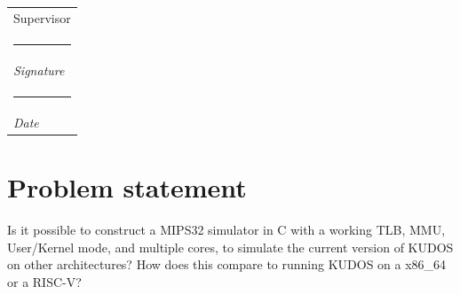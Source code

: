 \documentclass[11pt]{article}
\makeatletter
\newcommand{\namesigdate}[2][5cm]{%
  \begin{tabular}{@{}p{#1}@{}}
    #2 \\[2\normalbaselineskip] \hrule \\[0pt]
    {\small \textit{Signature}} \\[2\normalbaselineskip] \hrule \\[0pt]
    {\small \textit{Date}}
  \end{tabular}
}
\makeatother
\begin{document}

\clearpage\maketitle
\thispagestyle{empty}

\vfill
\noindent \namesigdate{Supervisor} %


\newpage

\section{Problem statement}
Is it possible to construct a MIPS32 simulator in C with a working TLB, MMU,
User/Kernel mode, and multiple cores, to simulate the current version of
KUDOS on other architectures?
How does this compare to running KUDOS on a x86\_64 or a RISC-V?
\end{document}
